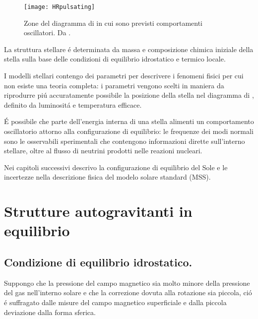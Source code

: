 \documentclass[../main.tex]{subfiles}
\begin{document}
\begin{wrapfigure}[20]{r}{0.6\textwidth}
\texttt{[image: HRpulsating]} \label{fig:HRp}
\caption{Zone del diagramma di \hr{} in cui sono previsti comportamenti oscillatori. Da \cite{chr97lecture}.}
\end{wrapfigure}

La struttura stellare \'e determinata da massa e composizione chimica iniziale della stella sulla base delle condizioni di equilibrio idrostatico e termico locale.

I modelli stellari contengo dei parametri per descrivere i fenomeni fisici per cui non esiste una teoria completa: i parametri vengono scelti in maniera da riprodurre pi\'u accuratamente possibile la posizione della stella nel diagramma di \hr{}, definito da luminosit\'a e temperatura efficace.


\'E possibile che parte dell'energia interna di una stella alimenti un comportamento oscillatorio attorno alla configurazione di equilibrio: le frequenze dei modi normali sono le osservabili sperimentali che contengono informazioni dirette sull'interno stellare, oltre al flusso di neutrini prodotti nelle reazioni nucleari.

 Nei capitoli successivi descrivo la configurazione di equilibrio del Sole e le incertezze nella descrizione fisica del modelo solare standard (MSS).


{\let\clearpage\relax\let\cleardoublepage\relax
\chapter{Strutture autogravitanti in equilibrio}
}

\section{Condizione di equilibrio idrostatico.}

Suppongo che la pressione del campo magnetico sia molto minore della pressione del gas nell'interno solare e che la correzione dovuta alla rotazione sia piccola, ci\'o \'e suffragato dalle misure del campo magnetico superficiale e dalla piccola deviazione dalla forma sferica.
\end{document}
